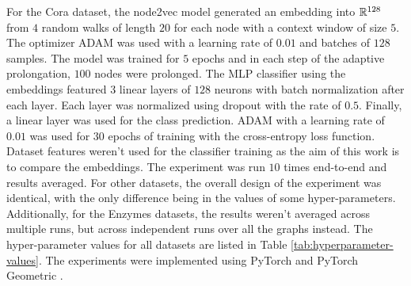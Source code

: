For the Cora dataset, the node2vec model generated an embedding into \( \mathbb{R}^{128} \) from \( 4 \) random walks of length \( 20 \) for each node with a context window of size \( 5 \). The optimizer ADAM \cite{kingma_adam:_2017} was used with a learning rate of \( 0.01 \) and batches of \( 128 \) samples. The model was trained for \( 5 \) epochs and in each step of the adaptive prolongation, \( 100 \) nodes were prolonged. The MLP classifier using the embeddings featured \( 3 \) linear layers of \( 128 \) neurons with batch normalization after each layer. Each layer was normalized using dropout \cite{srivastava_dropout_2014} with the rate of \( 0.5 \). Finally, a linear layer was used for the class prediction. ADAM with a learning rate of \( 0.01 \)  was used for \( 30 \) epochs of training with the cross-entropy loss function. Dataset features weren't used for the classifier training as the aim of this work is to compare the embeddings. The experiment was run \( 10 \) times end-to-end and results averaged. For other datasets, the overall design of the experiment was identical, with the only difference being in the values of some hyper-parameters. Additionally, for the Enzymes datasets, the results weren't averaged across multiple runs, but across independent runs over all the graphs instead. The hyper-parameter values for all datasets are listed in Table \ref{tab:hyperparameter-values}. The experiments were implemented using PyTorch \cite{paszke_pytorch_2019} and PyTorch Geometric \cite{fey_fast_2019}.

